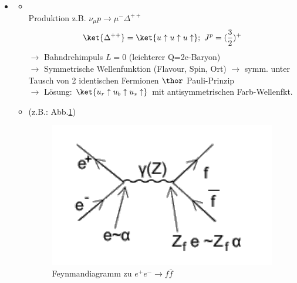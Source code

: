 \newpage
\begin{itemize}
\item {}
\begin{itemize}
\item[1.] \\
Produktion z.B. $\nu_\mu p\rightarrow\mu^-\Delta^{++}$
\begin{align}
\ket{\Delta^{++}}=\ket{u\uparrow u\uparrow u\uparrow};\ J^p=(\frac{3}{2})^+
\end{align}
$\rightarrow$ Bahndrehimpuls $L=0$ (leichterer Q=2e-Baryon)\\
$\rightarrow$ Symmetrische Wellenfunktion (Flavour, Spin, Ort)
$\rightarrow$ symm. unter Tausch von 2 identischen Fermionen $\thor$ Pauli-Prinzip\\
$\rightarrow$ Lösung: $\ket{u_r\uparrow u_b\uparrow u_s\uparrow}$ mit antisymmetrischen Farb-Wellenfkt. %
\item[2.]  (z.B.: Abb.\ref{fig:7.8})
\begin{figure}[!ht]
\centering
\includegraphics[width=.45\textwidth]{imgs/ep5-fig-7-8.pdf}
\caption{Feynmandiagramm zu $e^+e^-\rightarrow f\bar{f}$ \label{fig:7.8}}
\end{figure}


\end{itemize}
\end{itemize}
